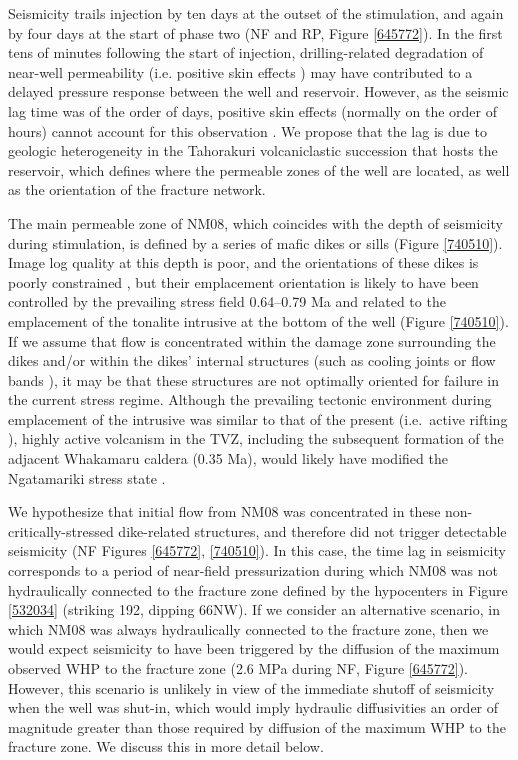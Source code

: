 Seismicity trails injection by ten days at the outset of the stimulation, and again by four days at the start of phase two (NF and RP, Figure \ref{645772}). In the first tens of minutes following the start of injection, drilling-related degradation of near-well permeability (i.e. positive skin effects \citep{Grant_2011}) may have contributed to a delayed pressure response between the well and reservoir. However, as the seismic lag time was of the order of days, positive skin effects (normally on the order of hours) cannot account for this observation \citep{horne1995modern}. We propose that the lag is due to geologic heterogeneity in the Tahorakuri volcaniclastic succession that hosts the reservoir, which defines where the permeable zones of the well are located, as well as the orientation of the fracture network.

The main permeable zone of NM08, which coincides with the depth of seismicity during stimulation, is defined by a series of mafic dikes or sills \citep{Chambefort_2014,massiot_2012} (Figure \ref{740510}). Image log quality at this depth is poor, and the orientations of these dikes is poorly constrained \citep{massiot_2012}, but their emplacement orientation is likely to have been controlled by the prevailing stress field 0.64--0.79 Ma \citep{Chambefort_2014} and related to the emplacement of the tonalite intrusive at the bottom of the well (Figure \ref{740510}). If we assume that flow is concentrated within the damage zone surrounding the dikes and/or within the dikes' internal structures (such as cooling joints or flow bands \citep{Massiot_2017}), it may be that these structures are not optimally oriented for failure in the current stress regime. Although the prevailing tectonic environment during emplacement of the intrusive was similar to that of the present (i.e.\ active rifting \citep{Wilson_2016}), highly active volcanism in the TVZ, including the subsequent formation of the adjacent Whakamaru caldera (0.35 Ma), would likely have modified the Ngatamariki stress state \citep{Wilson_1995}.

We hypothesize that initial flow from NM08 was concentrated in these non-critically-stressed dike-related structures, and therefore did not trigger detectable seismicity (NF Figures \ref{645772}, \ref{740510}). In this case, the time lag in seismicity corresponds to a period of near-field pressurization during which NM08 was not hydraulically connected to the fracture zone defined by the hypocenters in Figure \ref{532034} (striking 192\textdegree, dipping 66\textdegree NW). If we consider an alternative scenario, in which NM08 was always hydraulically connected to the fracture zone, then we would expect seismicity to have been triggered by the diffusion of the maximum observed WHP to the fracture zone (2.6 MPa during NF, Figure \ref{645772}). However, this scenario is unlikely in view of the immediate shutoff of seismicity when the well was shut-in, which would imply hydraulic diffusivities an order of magnitude greater than those required by diffusion of the maximum WHP to the fracture zone. We discuss this in more detail below.


